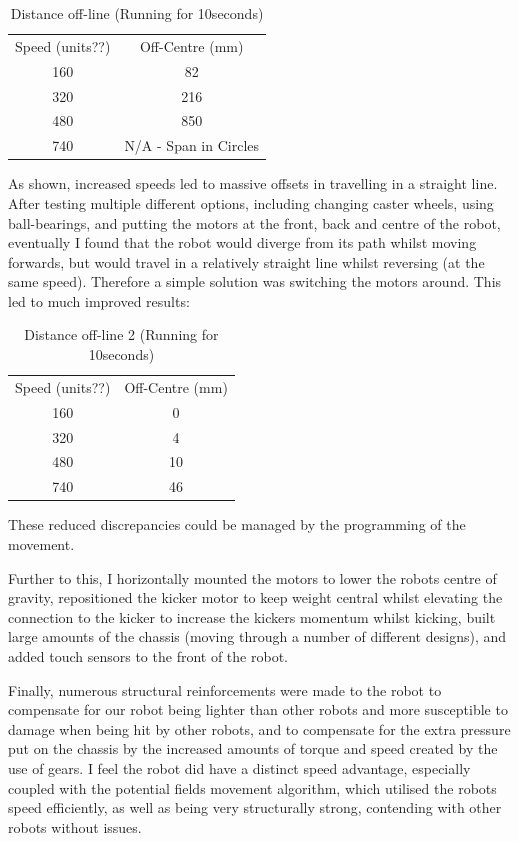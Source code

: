 \documentclass[12pt]{IEEEtran}
\begin{document}
\begin{table}[ht]
\caption{Distance off-line (Running for 10seconds)}
\centering
\begin{tabular}{c c}
\hline\hline
Speed (units??) & Off-Centre (mm) \\
160 & 82 \\
320 & 216 \\
480 & 850 \\
740 & N/A - Span in Circles \\
\hline\hline
\end{tabular}
\label{table:offline}
\end{table}

As shown, increased speeds led to massive offsets in travelling in a straight line. After testing multiple different options, including changing caster wheels, using ball-bearings, and putting the motors at the front, back and centre of the robot, eventually I found that the robot would diverge from its path whilst moving forwards, but would travel in a relatively straight line whilst reversing (at the same speed). Therefore a simple solution was switching the motors around. This led to much improved results:

\begin{table}[ht]
\caption{Distance off-line 2 (Running for 10seconds)}
\centering
\begin{tabular}{c c}
\hline\hline
Speed (units??) & Off-Centre (mm) \\
160 & 0 \\
320 & 4 \\
480 &  10\\
740 & 46\\
\hline\hline
\end{tabular}
\label{table:online}
\end{table}

These reduced discrepancies could be managed by the programming of the movement. \linebreak

Further to this, I horizontally mounted the motors to lower the robots centre of gravity, repositioned the kicker motor to keep weight central whilst elevating the connection to the kicker to increase the kickers momentum whilst kicking, built large amounts of the chassis (moving through a number of different designs), and added touch sensors to the front of the robot. \linebreak

Finally, numerous structural reinforcements were made to the robot to compensate for our robot being lighter than other robots and more susceptible to damage when being hit by other robots, and to compensate for the extra pressure put on the chassis by the increased amounts of torque and speed created by the use of gears. I feel the robot did have a distinct speed advantage, especially coupled with the potential fields movement algorithm, which utilised the robots speed efficiently, as well as being very structurally strong, contending with other robots without issues.
\end{document}
